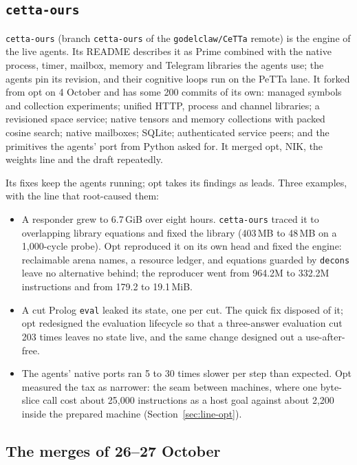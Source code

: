 \documentclass[11pt]{article}
\newcommand{\code}[1]{\texttt{#1}}
\newcommand{\PeTTa}{\textup{PeTTa}}
\begin{document}
\subsection{\code{cetta-ours}}
\label{sec:line-ours}

\code{cetta-ours} (branch \code{cetta-ours} of the \code{godelclaw/CeTTa}
remote) is the engine of the live agents.  Its README describes it as Prime
combined with the native process, timer, mailbox, memory and Telegram
libraries the agents use; the agents pin its revision, and their cognitive
loops run on the \PeTTa{} lane.  It forked from opt on 4 October and has some
200 commits of its own: managed symbols and collection experiments; unified
HTTP, process and channel libraries; a revisioned space service; native
tensors and memory collections with packed cosine search; native mailboxes;
SQLite; authenticated service peers; and the primitives the agents' port from
Python asked for.  It merged opt, NIK, the weights line and the draft
repeatedly.

Its fixes keep the agents running; opt takes its findings as leads.  Three
examples, with the line that root-caused them:

\begin{itemize}
\item A responder grew to 6.7\,GiB over eight hours.  \code{cetta-ours} traced
  it to overlapping library equations and fixed the library (403\,MB to 48\,MB
  on a 1{,}000-cycle probe).  Opt reproduced it on its own head and fixed the
  engine: reclaimable arena names, a resource ledger, and equations guarded by
  \code{decons} leave no alternative behind; the reproducer went from 964.2M to
  332.2M instructions and from 179.2 to 19.1\,MiB.
\item A cut Prolog \code{eval} leaked its state, one per cut.  The quick fix
  disposed of it; opt redesigned the evaluation lifecycle so that a
  three-answer evaluation cut 203 times leaves no state live, and the same
  change designed out a use-after-free.
\item The agents' native ports ran 5 to 30 times slower per step than
  expected.  Opt measured the tax as narrower: the seam between machines,
  where one byte-slice call cost about 25{,}000 instructions as a host goal
  against about 2{,}200 inside the prepared machine
  (Section~\ref{sec:line-opt}).
\end{itemize}

\subsection{The merges of 26--27 October}
\label{sec:merges}
\end{document}
